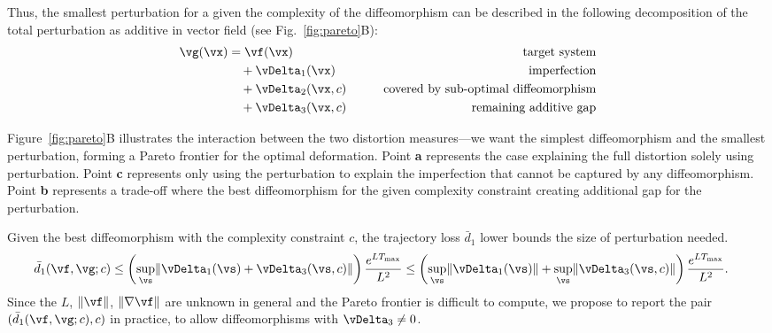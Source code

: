 \documentclass{article}
\theoremstyle{definition} \newtheorem{definition}{Definition}  \newtheorem{example}{Example}
\theoremstyle{remark} \newtheorem{remark}{Remark}
\newcounter{ct}
\DeclarePairedDelimiter{\norm}{\lVert}{\rVert}
\begin{document}
Thus, the smallest perturbation for a given the complexity of the diffeomorphism can be described in the following decomposition of the total perturbation as additive in vector field (see Fig.~\ref{fig:pareto}B):
\begin{align}\label{eq:decomp:triple}
    \vg(\vx) &= 
	\vf(\vx)
	&\qquad\text{target system}
	\\
	&\quad+\vDelta_1(\vx)
	&\qquad\text{imperfection}
	\\
	&\quad+\vDelta_2(\vx, c)
	&\qquad\text{covered by sub-optimal diffeomorphism}
	\\
	&\quad+\vDelta_3(\vx, c)
	&\qquad\text{remaining additive gap}
\end{align}

Figure~\ref{fig:pareto}B illustrates the interaction between the two distortion measures---we want the simplest diffeomorphism and the smallest perturbation, forming a Pareto frontier for the optimal deformation.
Point \textbf{a} represents the case explaining the full distortion solely using perturbation.
Point \textbf{c} represents only using the perturbation to explain the imperfection that cannot be captured by any diffeomorphism.
Point \textbf{b} represents a trade-off where the best diffeomorphism for the given complexity constraint creating additional gap for the perturbation.

Given the best diffeomorphism with the complexity constraint $c$, the trajectory loss $\bar{d}_1$ lower bounds the size of perturbation needed.
\begin{align}
    \bar{d}_1(\vf, \vg; c)
	&\leq
	    \left(\sup_\vs \norm{\vDelta_1(\vs) + \vDelta_3(\vs, c)}\right)
	    \frac{e^{LT_{\text{max}}}}{L^2}
	\leq
	    \left(\sup_\vs\norm{\vDelta_1(\vs)} + \sup_\vs\norm{\vDelta_3(\vs, c)}\right)
	    \frac{e^{LT_{\text{max}}}}{L^2}.
\end{align}
Since the $L$, $\norm{\vf}$, $\norm{\nabla\vf}$ are unknown in general and the Pareto frontier is difficult to compute, we propose to report the pair $(\bar{d}_1(\vf, \vg; c), c)$ in practice, to allow diffeomorphisms with $\vDelta_3 \neq 0$.
\end{document}
